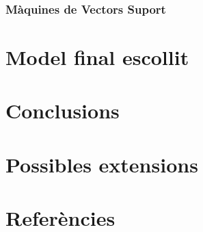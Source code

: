 \documentclass[a4paper]{article}
\begin{document}
\subsubsection{Màquines de Vectors Suport}

\section{Model final escollit}
\section{Conclusions}
\section{Possibles extensions}
\section{Referències}



\end{document}
